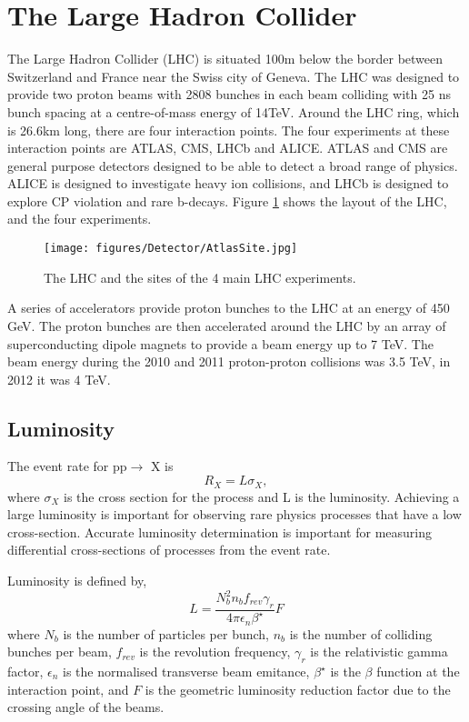 \section{The Large Hadron Collider}
\label{sec:Det:LHC}

The Large Hadron Collider (LHC) is situated 100m below the border between Switzerland and France near the Swiss city of Geneva. 
The LHC was designed to provide two proton beams with 2808 bunches in each beam colliding with 25 ns bunch spacing at a centre-of-mass energy of 14TeV.
Around the LHC ring, which is 26.6km long, there are four interaction points. 
The four experiments at these interaction points are ATLAS, CMS, LHCb and ALICE.
ATLAS and CMS are general purpose detectors designed to be able to detect a broad range of physics. ALICE is designed to investigate heavy ion collisions, and LHCb is designed to explore CP violation and rare b-decays.
Figure \ref{Det:LHC} shows the layout of the LHC, and the four experiments.

\begin{figure}
\centering
\texttt{[image: figures/Detector/AtlasSite.jpg]}
  \caption{The LHC and the sites of the 4 main LHC experiments.}
\label{Det:LHC}
\end{figure}

A series of accelerators provide proton bunches to the LHC at an energy of 450 GeV.
The proton bunches are then accelerated around the LHC by an array of superconducting dipole magnets to provide a beam energy up to 7 TeV.
The beam energy during the 2010 and 2011 proton-proton collisions was 3.5 TeV, in 2012 it was 4 TeV.


\subsection{Luminosity}

The event rate for pp$\rightarrow$ X is
\begin{equation}
R_X = L \sigma_X,
\label{Det:Lumi}
\end{equation}
where $\sigma_X$ is the cross section for the process and L is the luminosity.
Achieving a large luminosity is important for observing rare physics processes that have a low cross-section. 
Accurate luminosity determination is important for measuring differential cross-sections of processes from the event rate. 

Luminosity is defined by,
\begin{equation}
L=\frac{N_b^2n_bf_{rev}\gamma_r}{4\pi\epsilon_n\beta^\star}F
\label{Det:Lumi}
\end{equation}
where $N_b$ is the number of particles per bunch, $n_b$ is the number of colliding bunches per beam, $f_{rev}$ is the revolution frequency, $\gamma_r$ is the relativistic gamma factor, $\epsilon_n$ is the normalised transverse beam emitance, $\beta^\star$ is the $\beta$ function at the interaction point, and $F$ is the geometric luminosity reduction factor due to the crossing angle of the beams.


